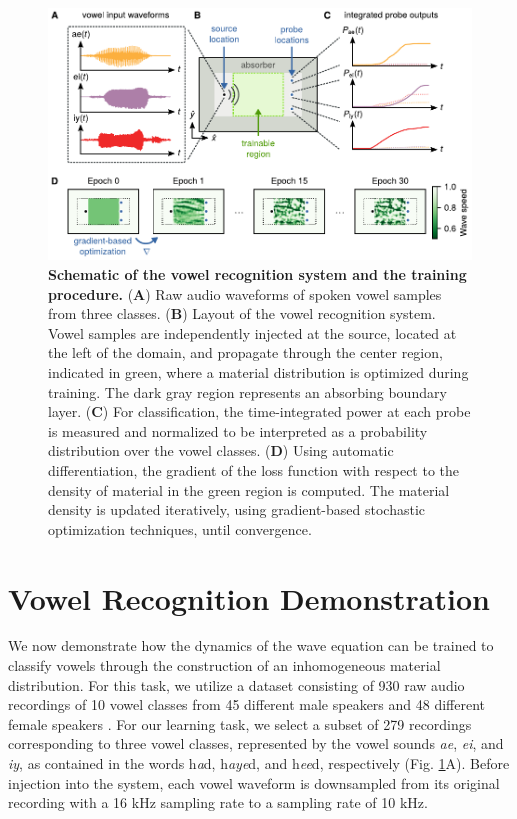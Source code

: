 \begin{figure}
  \centering
  \includegraphics{figures/insitu_RNN_train}
  \caption{
  \textbf{Schematic of the vowel recognition system and the training procedure.}
  (\textbf{A})
  Raw audio waveforms of spoken vowel samples from three classes.
  (\textbf{B})
  Layout of the vowel recognition system. Vowel samples are independently injected at the source, located at the left of the domain, and propagate through the center region, indicated in green, where a material distribution is optimized during training. The dark gray region represents an absorbing boundary layer.
  (\textbf{C})
  For classification, the time-integrated power at each probe is measured and normalized to be interpreted as a probability distribution over the vowel classes.
  (\textbf{D})
  Using automatic differentiation, the gradient of the loss function with respect to the density of material in the green region is computed. The material density is updated iteratively, using gradient-based stochastic optimization techniques, until convergence.
  }
  \label{fig:train}
\end{figure}

\section{Vowel Recognition Demonstration}

We now demonstrate how the dynamics of the wave equation can be trained to classify vowels through the construction of an inhomogeneous material distribution. 
For this task, we utilize a dataset consisting of 930 raw audio recordings of 10 vowel classes from 45 different male speakers and 48 different female speakers \cite{hillenbrand_acoustic_1995}.
For our learning task, we select a subset of 279 recordings corresponding to three vowel classes, represented by the vowel sounds \textit{ae}, \textit{ei}, and \textit{iy}, as contained in the words h\textit{a}d, h\textit{aye}d, and h\textit{ee}d, respectively (Fig. \ref{fig:train}A).
Before injection into the system, each vowel waveform is downsampled from its original recording with a 16 kHz sampling rate to a sampling rate of 10 kHz.

